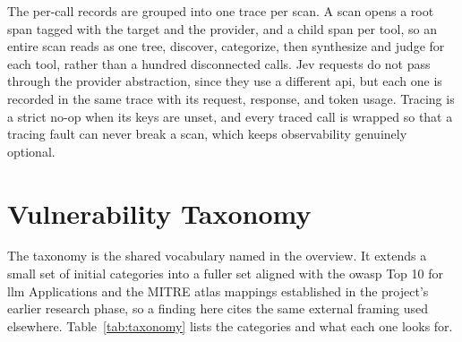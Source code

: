 The per-call records are grouped into one trace per scan. A scan opens a root span tagged with the target and the provider, and a child span per tool, so an entire scan reads as one tree, discover, categorize, then synthesize and judge for each tool, rather than a hundred disconnected calls. Jev requests do not pass through the provider abstraction, since they use a different \gls{api}, but each one is recorded in the same trace with its request, response, and token usage. Tracing is a strict no-op when its keys are unset, and every traced call is wrapped so that a tracing fault can never break a scan, which keeps observability genuinely optional.

\section{Vulnerability Taxonomy}
\label{sec:taxonomy}

The taxonomy is the shared vocabulary named in the overview. It extends a small set of initial categories into a fuller set aligned with the \gls{owasp} Top 10 for \gls{llm} Applications and the MITRE \gls{atlas} mappings established in the project's earlier research phase, so a finding here cites the same external framing used elsewhere. Table~\ref{tab:taxonomy} lists the categories and what each one looks for.

